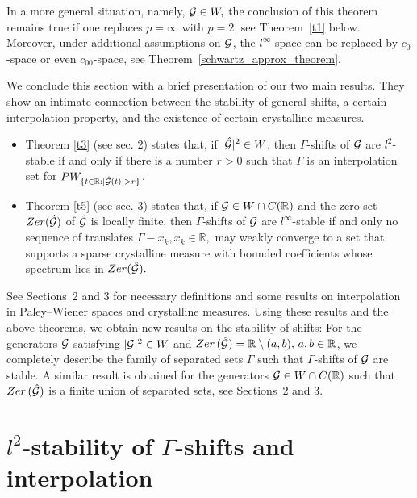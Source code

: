 \documentclass[12pt]{amsart}
\numberwithin{equation}{section}
\newcommand{\R}{{\mathbb R}} \newcommand{\Q}{{\mathbb Q}} \newcommand{\Z}{{\mathbb Z}} \newcommand{\N}{{\mathbb N}}
\newcommand{\Zer}{{\rm Zer}}
\begin{document}
In a more general situation, namely, $\mathcal{G} \in W,$ the conclusion of this theorem  remains true if one replaces $p=\infty$ with $p=2$, see Theorem~\ref{t1} below. Moreover, under additional assumptions on $\mathcal{G}$, the $l^{\infty}$-space can be replaced by $c_0$-space or even $c_{00}$-space, see Theorem~\ref{schwartz_approx_theorem}.



We conclude this section with a brief presentation of our two main results.
They show an intimate connection between the stability of general shifts, a certain interpolation property, and the existence of certain crystalline measures. 

\begin{itemize}
    \item Theorem \ref{t3} (see  sec. 2) states that, if $|\hat{\mathcal{G}}|^2\in W$, then $\Gamma$-shifts of $\mathcal{G}$ are $l^2$-stable if and only if there is a number $r>0$ such that $\Gamma$ is an interpolation set for $PW_{\{t\in\R: |\hat\Ff(t)|>r\}}$.

    \item Theorem \ref{t5}  (see sec. 3) states that, if $\Ff\in W\cap C(\R)$ and the zero set ${\rm Zer}(\hat\Ff)$ of $\hat{\mathcal{G}}$ is locally finite,  then $\Gamma$-shifts of $\mathcal{G}$ are $l^{\infty}$-stable if and only no sequence of translates $\Gamma-x_k,x_k\in\R,$ may weakly converge to a set that supports a sparse crystalline measure with bounded coefficients whose spectrum lies in ${\rm Zer}(\hat\Ff).$
\end{itemize}

See Sections~2 and 3 for necessary definitions and some results on interpolation in Paley--Wiener spaces and crystalline measures. 
Using these results and the above theorems, we obtain new results on the stability of shifts: For the generators $\mathcal{G}$ satisfying $|\mathcal{G}|^2\in W$ and $\Zer{\,(\hat{\Ff})} = \R \setminus (a,b), \, a,b \in \R$, we completely describe the family of separated sets $\Gamma$ such that $\Gamma$-shifts of $\mathcal{G}$ are stable.  A similar result is obtained for the generators $\Ff\in W\cap C(\R)$ such that $\Zer{\,(\hat{\Ff})}$ is a finite union of separated sets, see  Sections~2 and 3. 

\section{\texorpdfstring{$l^2$}{l2}-stability of \texorpdfstring{$\Gamma$}{Gamma}-shifts and interpolation}\label{Sec_stab_interpol}
\end{document}
